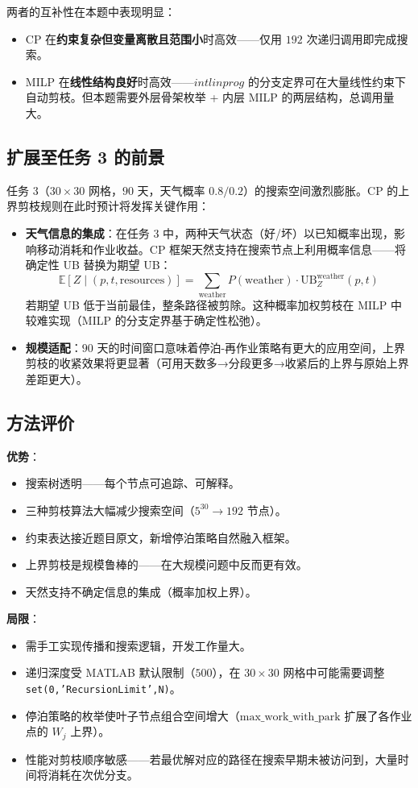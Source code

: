 \documentclass[12pt,a4paper]{ctexart}
\theoremstyle{definition}
\begin{document}
两者的互补性在本题中表现明显：
\begin{itemize}
  \item CP 在\textbf{约束复杂但变量离散且范围小}时高效——仅用 $192$ 次递归调用即完成搜索。
  \item MILP 在\textbf{线性结构良好}时高效——$intlinprog$ 的分支定界可在大量线性约束下自动剪枝。但本题需要外层骨架枚举 + 内层 MILP 的两层结构，总调用量大。
\end{itemize}

\subsection{扩展至任务 3 的前景}

任务 3（$30\times 30$ 网格，$90$ 天，天气概率 $0.8/0.2$）的搜索空间激烈膨胀。CP 的上界剪枝规则在此时预计将发挥关键作用：

\begin{itemize}
  \item \textbf{天气信息的集成}：在任务 3 中，两种天气状态（好/坏）以已知概率出现，影响移动消耗和作业收益。CP 框架天然支持在搜索节点上利用概率信息——将确定性 UB 替换为期望 UB：
  \begin{equation}
    \mathbb{E}[Z\mid(p,t,\text{resources})] = \sum_{\text{weather}} P(\text{weather})\cdot \text{UB}_Z^{\text{weather}}(p,t)
  \end{equation}
  若期望 UB 低于当前最佳，整条路径被剪除。这种概率加权剪枝在 MILP 中较难实现（MILP 的分支定界基于确定性松弛）。

  \item \textbf{规模适配}：$90$ 天的时间窗口意味着停泊-再作业策略有更大的应用空间，上界剪枝的收紧效果将更显著（可用天数多→分段更多→收紧后的上界与原始上界差距更大）。
\end{itemize}

\subsection{方法评价}

\textbf{优势}：
\begin{itemize}
  \item 搜索树透明——每个节点可追踪、可解释。
  \item 三种剪枝算法大幅减少搜索空间（$5^{30}\to 192$ 节点）。
  \item 约束表达接近题目原文，新增停泊策略自然融入框架。
  \item 上界剪枝是规模鲁棒的——在大规模问题中反而更有效。
  \item 天然支持不确定信息的集成（概率加权上界）。
\end{itemize}

\textbf{局限}：
\begin{itemize}
  \item 需手工实现传播和搜索逻辑，开发工作量大。
  \item 递归深度受 MATLAB 默认限制（$500$），在 $30\times 30$ 网格中可能需要调整 \texttt{set(0,'RecursionLimit',N)}。
  \item 停泊策略的枚举使叶子节点组合空间增大（$\text{max\_work\_with\_park}$ 扩展了各作业点的 $W_j$ 上界）。
  \item 性能对剪枝顺序敏感——若最优解对应的路径在搜索早期未被访问到，大量时间将消耗在次优分支。
\end{itemize}
\end{document}
